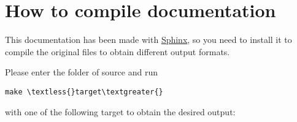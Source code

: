 \documentclass[a4paper,11pt,oneside]{sphinxmanual}
\begin{document}
\section{How to compile documentation}
\label{info:how-to-compile-documentation}
This documentation has been made with \href{http://sphinx.pocoo.org}{Sphinx}, so you
need to install it to compile the original files to obtain different
output formats.

Please enter the  folder of  source and run

\begin{Verbatim}[commandchars=\\\{\}]
make \textless{}target\textgreater{}
\end{Verbatim}

with one of the following target to obtain the desired output:
\end{document}
